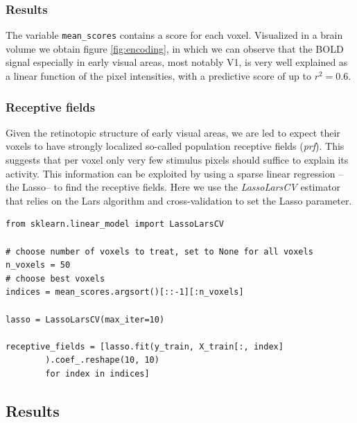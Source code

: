 \documentclass{frontiersSCNS} %
\begin{document}
\subsubsection{Results}
The variable \texttt{mean\_scores} contains a score for each voxel.
Visualized in a brain volume we obtain figure \ref{fig:encoding},
in which we can observe that the BOLD signal especially in early visual
areas, most notably V1, is very well explained as a linear function of
the pixel intensities, with a predictive score of up to \(r^2 = 0.6\).

\subsubsection{Receptive fields}
Given the retinotopic structure of early visual areas, we are led to
expect their voxels to have strongly localized so-called population
receptive fields (\textit{prf}). This suggests that per voxel only very
few stimulus pixels should suffice to explain its activity. This
information can be exploited by using a sparse linear regression --the
Lasso-- to find the receptive fields. Here we use the \emph{LassoLarsCV}
estimator that relies on the Lars algorithm and cross-validation to set
the Lasso parameter.

\begin{lstlisting}
from sklearn.linear_model import LassoLarsCV

# choose number of voxels to treat, set to None for all voxels
n_voxels = 50
# choose best voxels
indices = mean_scores.argsort()[::-1][:n_voxels]

lasso = LassoLarsCV(max_iter=10)

receptive_fields = [lasso.fit(y_train, X_train[:, index]
        ).coef_.reshape(10, 10)
        for index in indices]

\end{lstlisting}

\subsection{Results}
\end{document}
